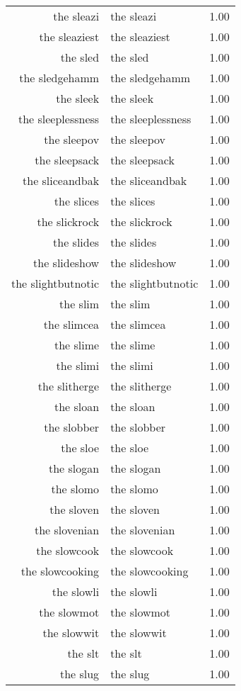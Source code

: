 \begin{table}[ht]
\begin{tabular}{rlr}
  the sleazi & the sleazi & 1.00 \\ 
  the sleaziest & the sleaziest & 1.00 \\ 
  the sled & the sled & 1.00 \\ 
  the sledgehamm & the sledgehamm & 1.00 \\ 
  the sleek & the sleek & 1.00 \\ 
  the sleeplessness & the sleeplessness & 1.00 \\ 
  the sleepov & the sleepov & 1.00 \\ 
  the sleepsack & the sleepsack & 1.00 \\ 
  the sliceandbak & the sliceandbak & 1.00 \\ 
  the slices & the slices & 1.00 \\ 
  the slickrock & the slickrock & 1.00 \\ 
  the slides & the slides & 1.00 \\ 
  the slideshow & the slideshow & 1.00 \\ 
  the slightbutnotic & the slightbutnotic & 1.00 \\ 
  the slim & the slim & 1.00 \\ 
  the slimcea & the slimcea & 1.00 \\ 
  the slime & the slime & 1.00 \\ 
  the slimi & the slimi & 1.00 \\ 
  the slitherge & the slitherge & 1.00 \\ 
  the sloan & the sloan & 1.00 \\ 
  the slobber & the slobber & 1.00 \\ 
  the sloe & the sloe & 1.00 \\ 
  the slogan & the slogan & 1.00 \\ 
  the slomo & the slomo & 1.00 \\ 
  the sloven & the sloven & 1.00 \\ 
  the slovenian & the slovenian & 1.00 \\ 
  the slowcook & the slowcook & 1.00 \\ 
  the slowcooking & the slowcooking & 1.00 \\ 
  the slowli & the slowli & 1.00 \\ 
  the slowmot & the slowmot & 1.00 \\ 
  the slowwit & the slowwit & 1.00 \\ 
  the slt & the slt & 1.00 \\ 
  the slug & the slug & 1.00 \\ 

\end{tabular}
\end{table}
